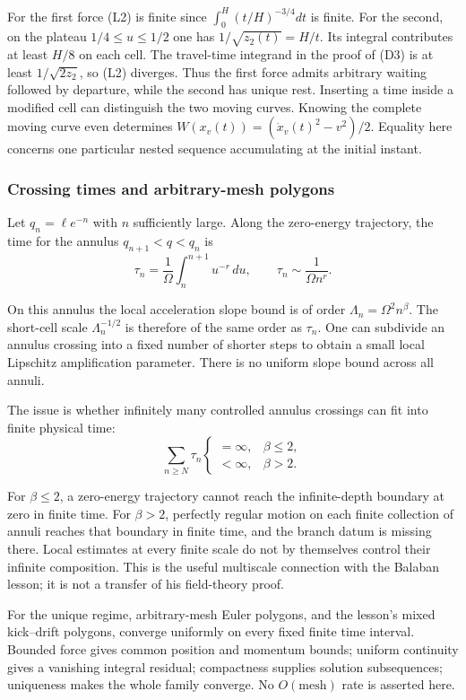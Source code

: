 \documentclass[11pt,a4paper]{article}
\begin{document}
For the first force (L2) is finite since \(\int_0^H(t/H)^{-3/4}dt\) is
finite. For the second, on the plateau \(1/4\le u\le1/2\) one has
\(1/\sqrt{z_2(t)}=H/t\). Its integral contributes at least \(H/8\) on
each cell. The travel-time integrand in the proof of (D3) is at least
\(1/\sqrt{2z_2}\), so (L2) diverges. Thus the first force admits
arbitrary waiting followed by departure, while the second has unique
rest. Inserting a time inside a modified cell can distinguish the two
moving curves. Knowing the complete moving curve even determines
\(W(x_v(t))=(\dot x_v(t)^2-v^2)/2\). Equality here concerns one
particular nested sequence accumulating at the initial instant.

\subsubsection{Crossing times and arbitrary-mesh
polygons}\label{crossing-times-and-arbitrary-mesh-polygons}

Let \(q_n=\ell e^{-n}\) with \(n\) sufficiently large. Along the
zero-energy trajectory, the time for the annulus \(q_{n+1}<q<q_n\) is \[
 \tau_n=\frac1\Omega\int_n^{n+1}u^{-r}\,du,
 \qquad \tau_n\sim\frac1{\Omega n^r}.
 \tag{L8}
\]

On this annulus the local acceleration slope bound is of order
\(\Lambda_n=\Omega^2n^\beta\). The short-cell scale \(\Lambda_n^{-1/2}\)
is therefore of the same order as \(\tau_n\). One can subdivide an
annulus crossing into a fixed number of shorter steps to obtain a small
local Lipschitz amplification parameter. There is no uniform slope bound
across all annuli.

The issue is whether infinitely many controlled annulus crossings can
fit into finite physical time: \[
 \sum_{n\ge N}\tau_n
 \begin{cases}
 =\infty,&\beta\le2,\\
 <\infty,&\beta>2.
 \end{cases}
 \tag{L9}
\]

For \(\beta\le2\), a zero-energy trajectory cannot reach the
infinite-depth boundary at zero in finite time. For \(\beta>2\),
perfectly regular motion on each finite collection of annuli reaches
that boundary in finite time, and the branch datum is missing there.
Local estimates at every finite scale do not by themselves control their
infinite composition. This is the useful multiscale connection with the
Balaban lesson; it is not a transfer of his field-theory proof.

For the unique regime, arbitrary-mesh Euler polygons, and the lesson's
mixed kick--drift polygons, converge uniformly on every fixed finite
time interval. Bounded force gives common position and momentum bounds;
uniform continuity gives a vanishing integral residual; compactness
supplies solution subsequences; uniqueness makes the whole family
converge. No \(O(\text{mesh})\) rate is asserted here.
\end{document}
